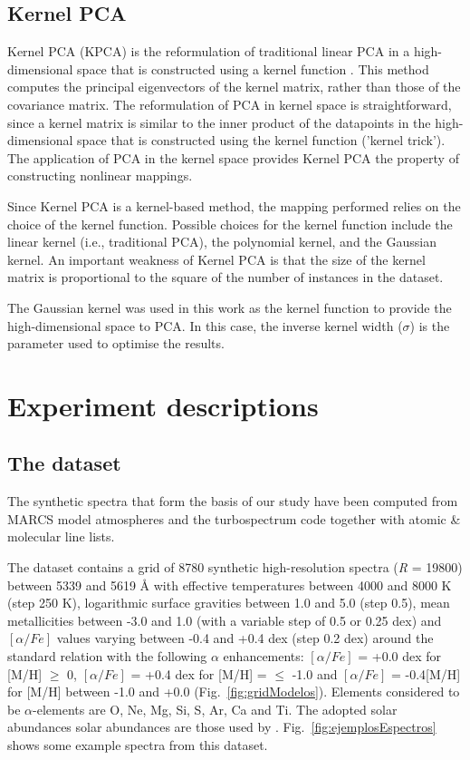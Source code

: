 \documentclass[a4paper,fleqn,usenatbib]{mnras}
\begin{document}
\subsection{Kernel PCA}

Kernel PCA (KPCA) is the reformulation of traditional linear PCA in a
high-dimensional space that is constructed using a kernel function
\citep{sholkopf:98}. This method computes the principal eigenvectors of
the kernel matrix, rather than those of the covariance matrix. The
reformulation of PCA in kernel space is straightforward, since a
kernel matrix is similar to the inner product of the datapoints in the
high-dimensional space that is constructed using the kernel function
('kernel trick'). The application of PCA in the kernel space provides
Kernel PCA the property of constructing nonlinear mappings.

Since Kernel PCA is a kernel-based method, the mapping performed
relies on the choice of the kernel function. Possible choices for the
kernel function include the linear kernel (i.e., traditional PCA), the
polynomial kernel, and the Gaussian kernel. An important weakness of
Kernel PCA is that the size of the kernel matrix is proportional to
the square of the number of instances in the dataset.

The Gaussian kernel was used in this work as the kernel function 
to provide the high-dimensional space to PCA. In this case, the 
inverse kernel width ($\sigma$) is the parameter used to optimise 
the results. 
 

\section{Experiment descriptions}
\label{sec:experiment}
\subsection{The dataset}

The synthetic spectra that form the basis of our study have been
computed from MARCS model atmospheres \citep{gustafsson:08} and the
turbospectrum code \citep{alvarez:98, plez:12} together with atomic \&
molecular line lists.

The dataset contains a grid of 8780 synthetic high-resolution spectra
(\textit{R} = 19800) between 5339 and 5619 {\AA}
with effective temperatures between 4000 and 8000 K (step 250 K),
logarithmic surface gravities between 1.0 and 5.0 (step 0.5), mean
metallicities between -3.0 and 1.0 (with a variable step of 0.5 or
0.25 dex) and $\left[ \alpha/Fe \right]$ values varying between -0.4
and +0.4 dex (step 0.2 dex) around the standard relation with the
following $\alpha$ enhancements: $\left[ \alpha/Fe \right]$ = +0.0 dex
for [M/H] $\geqslant$ 0, $\left[ \alpha/Fe \right]$ = +0.4 dex for
[M/H] = $\leqslant$ -1.0 and $\left[ \alpha/Fe \right]$ = -0.4[M/H]
for [M/H] between -1.0 and +0.0 (Fig.~\ref{fig:gridModelos}).  
Elements considered to be $\alpha$-elements are O, Ne, Mg, Si, S, 
Ar, Ca and Ti. The adopted solar abundances solar abundances are those 
used by \citep{gustafsson:08}.
Fig.~\ref{fig:ejemplosEspectros} shows some example spectra 
from this dataset.
\end{document}
